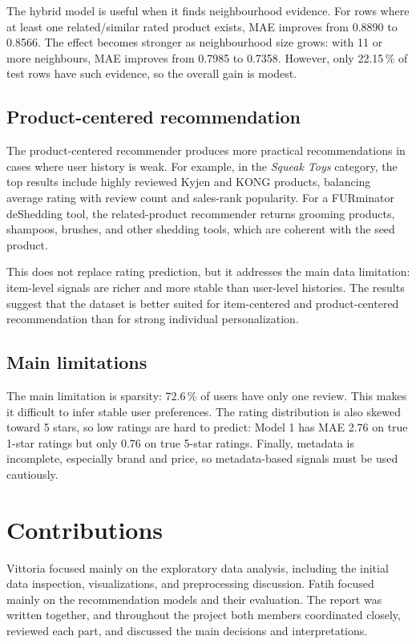 \documentclass[11pt,a4paper]{article}
\begin{document}
The hybrid model is useful when it finds neighbourhood evidence. For rows where at least one related/similar rated product exists, MAE improves from 0.8890 to 0.8566. The effect becomes stronger as neighbourhood size grows: with 11 or more neighbours, MAE improves from 0.7985 to 0.7358. However, only 22.15\,\% of test rows have such evidence, so the overall gain is modest.

\subsection{Product-centered recommendation}

The product-centered recommender produces more practical recommendations in cases where user history is weak. For example, in the \textit{Squeak Toys} category, the top results include highly reviewed Kyjen and KONG products, balancing average rating with review count and sales-rank popularity. For a FURminator deShedding tool, the related-product recommender returns grooming products, shampoos, brushes, and other shedding tools, which are coherent with the seed product.

This does not replace rating prediction, but it addresses the main data limitation: item-level signals are richer and more stable than user-level histories. The results suggest that the dataset is better suited for item-centered and product-centered recommendation than for strong individual personalization.

\subsection{Main limitations}

The main limitation is sparsity: 72.6\,\% of users have only one review. This makes it difficult to infer stable user preferences. The rating distribution is also skewed toward 5 stars, so low ratings are hard to predict: Model 1 has MAE 2.76 on true 1-star ratings but only 0.76 on true 5-star ratings. Finally, metadata is incomplete, especially brand and price, so metadata-based signals must be used cautiously.
 
\section{Contributions}

Vittoria focused mainly on the exploratory data analysis, including the initial data inspection, visualizations, and preprocessing discussion. Fatih focused mainly on the recommendation models and their evaluation. The report was written together, and throughout the project both members coordinated closely, reviewed each part, and discussed the main decisions and interpretations.
 
\end{document}
